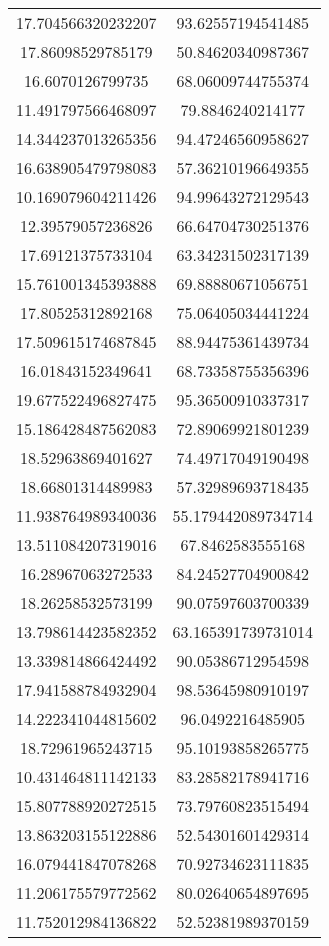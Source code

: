 \begin{table}
\begin{tabular}{cc}
17.704566320232207 & 93.62557194541485 \\
17.86098529785179 & 50.84620340987367 \\
16.6070126799735 & 68.06009744755374 \\
11.491797566468097 & 79.8846240214177 \\
14.344237013265356 & 94.47246560958627 \\
16.638905479798083 & 57.36210196649355 \\
10.169079604211426 & 94.99643272129543 \\
12.39579057236826 & 66.64704730251376 \\
17.69121375733104 & 63.34231502317139 \\
15.761001345393888 & 69.88880671056751 \\
17.80525312892168 & 75.06405034441224 \\
17.509615174687845 & 88.94475361439734 \\
16.01843152349641 & 68.73358755356396 \\
19.677522496827475 & 95.36500910337317 \\
15.186428487562083 & 72.89069921801239 \\
18.52963869401627 & 74.49717049190498 \\
18.66801314489983 & 57.32989693718435 \\
11.938764989340036 & 55.179442089734714 \\
13.511084207319016 & 67.8462583555168 \\
16.28967063272533 & 84.24527704900842 \\
18.26258532573199 & 90.07597603700339 \\
13.798614423582352 & 63.165391739731014 \\
13.339814866424492 & 90.05386712954598 \\
17.941588784932904 & 98.53645980910197 \\
14.222341044815602 & 96.0492216485905 \\
18.72961965243715 & 95.10193858265775 \\
10.431464811142133 & 83.28582178941716 \\
15.807788920272515 & 73.79760823515494 \\
13.863203155122886 & 52.54301601429314 \\
16.079441847078268 & 70.92734623111835 \\
11.206175579772562 & 80.02640654897695 \\
11.752012984136822 & 52.52381989370159 \\

\end{tabular}
\end{table}
